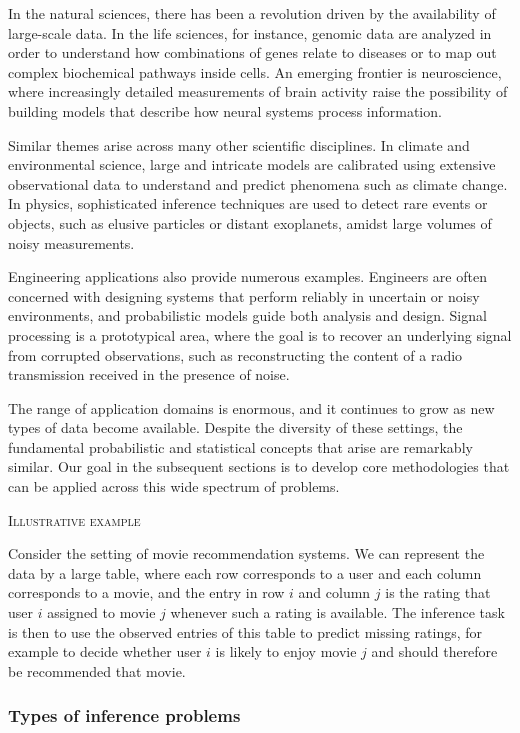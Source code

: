In the natural sciences, there has been a revolution driven by the availability of large-scale data.  
In the life sciences, for instance, genomic data are analyzed in order to understand how combinations of genes relate to diseases or to map out complex biochemical pathways inside cells.  
An emerging frontier is neuroscience, where increasingly detailed measurements of brain activity raise the possibility of building models that describe how neural systems process information.  

Similar themes arise across many other scientific disciplines.  
In climate and environmental science, large and intricate models are calibrated using extensive observational data to understand and predict phenomena such as climate change.  
In physics, sophisticated inference techniques are used to detect rare events or objects, such as elusive particles or distant exoplanets, amidst large volumes of noisy measurements.  

Engineering applications also provide numerous examples.  
Engineers are often concerned with designing systems that perform reliably in uncertain or noisy environments, and probabilistic models guide both analysis and design.  
Signal processing is a prototypical area, where the goal is to recover an underlying signal from corrupted observations, such as reconstructing the content of a radio transmission received in the presence of noise.  

The range of application domains is enormous, and it continues to grow as new types of data become available.  
Despite the diversity of these settings, the fundamental probabilistic and statistical concepts that arise are remarkably similar.  
Our goal in the subsequent sections is to develop core methodologies that can be applied across this wide spectrum of problems.

\bigskip
\textsc{Illustrative example}

Consider the setting of movie recommendation systems.  
We can represent the data by a large table, where each row corresponds to a user and each column corresponds to a movie, and the entry in row \(i\) and column \(j\) is the rating that user \(i\) assigned to movie \(j\) whenever such a rating is available.  
The inference task is then to use the observed entries of this table to predict missing ratings, for example to decide whether user \(i\) is likely to enjoy movie \(j\) and should therefore be recommended that movie.


\subsubsection{Types of inference problems}


